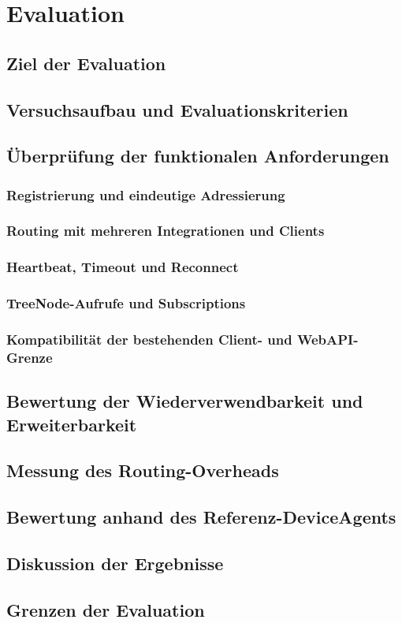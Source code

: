 \chapter{Evaluation}
\section{Ziel der Evaluation}
\section{Versuchsaufbau und Evaluationskriterien}

\section{Überprüfung der funktionalen Anforderungen}
\subsection{Registrierung und eindeutige Adressierung}
\subsection{Routing mit mehreren Integrationen und Clients}
\subsection{Heartbeat, Timeout und Reconnect}
\subsection{TreeNode-Aufrufe und Subscriptions}
\subsection{Kompatibilität der bestehenden Client- und WebAPI-Grenze}

\section{Bewertung der Wiederverwendbarkeit und Erweiterbarkeit}
\section{Messung des Routing-Overheads}
\section{Bewertung anhand des Referenz-DeviceAgents}
\section{Diskussion der Ergebnisse}
\section{Grenzen der Evaluation}
